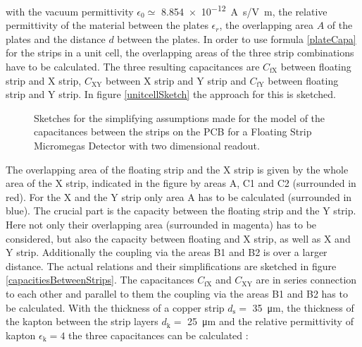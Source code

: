 \documentclass[
a4paper,                                %
twoside,                                %
BCOR1.4cm,                      %
10pt,                           %
headings=normal,                %
headsepline,                    %
clearplainpage, %
final,                                  %
div=14,
parskip=full,
openright,
bibliography=toc
]{scrreprt}
\begin{document}
with the vacuum permittivity $\epsilon_{0}\simeq$ \SI{8.854e-12}{\A\s/\V\m}, the relative permittivity of the material between the plates $\epsilon_{r}$, the overlapping area $A$ of the plates and the distance $d$ between the plates. In order to use formula \ref{plateCapa} for the strips in a unit cell, the overlapping areas of the three strip combinations have to be calculated. The three resulting capacitances are $C_{\mathrm{fX}}$ between floating strip and X strip, $C_{\mathrm{XY}}$  between X strip and Y strip and $C_{\mathrm{fY}}$ between floating strip and Y strip. In figure \ref{unitcellSketch} the approach for this is sketched.

\begin{figure}[H]	
	\centering
	\qquad
	\caption{Sketches for the simplifying assumptions made for the model of the capacitances between the strips on the PCB for a Floating Strip Micromegas Detector with two dimensional readout.}
	\label{capacitiesSketch}
\end{figure}

The overlapping area of the floating strip and the X strip is given by the whole area of the X strip, indicated in the figure by areas A, C1 and C2 (surrounded in red). For the X and the Y strip only area A has to be calculated (surrounded in blue). The crucial part is the capacity between the floating strip and the Y strip. Here not only their overlapping area (surrounded in magenta) has to be considered, but also the capacity between floating and X strip, as well as X and Y strip. Additionally the coupling via the areas B1 and B2 is over a larger distance. The actual relations and their simplifications are sketched in figure \ref{capacitiesBetweenStrips}. The capacitances $C_{\mathrm{fX}}$ and $C_{\mathrm{XY}}$ are in series connection to each other and parallel to them the coupling via the areas B1 and B2 has to be calculated. With the thickness of a copper strip $d_{\mathrm{s}}=$ \SI{35}{\micro\m}, the thickness of the kapton between the strip layers $d_{\mathrm{k}}=$ \SI{25}{\micro\m} and the relative permittivity of kapton $\epsilon_{\mathrm{k}}=4$ the three capacitances can be calculated : 
\end{document}
